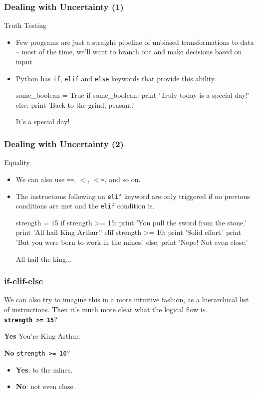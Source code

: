 \documentclass[10pt]{beamer}
\begin{document}
\begin{frame}[fragile]
  \frametitle{Dealing with Uncertainty (1)}
  \begin{block}{Truth Testing}
    \begin{itemize}
      \item Few programs are just a straight pipeline of unbiased transformations to data -- most of the time, we'll want to branch out and make decisions based on input.
      \item Python has \texttt{if}, \texttt{elif} and \texttt{else} keywords that provide this ability.
      \begin{pythoncode}
  some_boolean = True
  if some_boolean:
    print 'Truly today is a special day!'
  else:
    print 'Back to the grind, peasant.'
      \end{pythoncode}
      It's a special day!
    \end{itemize}
  \end{block}
\end{frame}
      
\begin{frame}[fragile]
  \frametitle{Dealing with Uncertainty (2)}
  \begin{block}{Equality}
    \begin{itemize}
      \item We can also use \texttt{==}, \texttt{$<$}, \texttt{$<$=}, and so on.
      \item The instructions following an \texttt{elif} keyword are only triggered if no previous conditions are met and the \texttt{elif} condition is.
      \begin{pythoncode}
  strength = 15
  if strength >= 15:
    print 'You pull the sword from the stone.'
    print 'All hail King Arthur!'
  elif strength >= 10:
    print 'Solid effort.'
    print 'But you were born to work in the mines.'
  else:
    print 'Nope! Not even close.'
      \end{pythoncode}
      All hail the king...
    \end{itemize}
  \end{block}
\end{frame}

\begin{frame}[fragile]
  \frametitle{if-elif-else}
  We can also try to imagine this in a more intuitive fashion, as a hierarchical list of instructions.
  Then it's much more clear what the logical flow is. \\
  \vspace{10px}
  \large
  \textbf{\texttt{strength >= 15}}?
  \normalsize
  \begin{block}{\textbf{Yes}}
    You're King Arthur.
  \end{block}
  \vspace{10px}
  \begin{block}{\textbf{No}}
    \indent \texttt{strength >= 10}?
    \begin{itemize}
      \item \textbf{Yes}: to the mines.
      \item \textbf{No}: not even close.
    \end{itemize}
  \end{block}
\end{frame}
\end{document}

